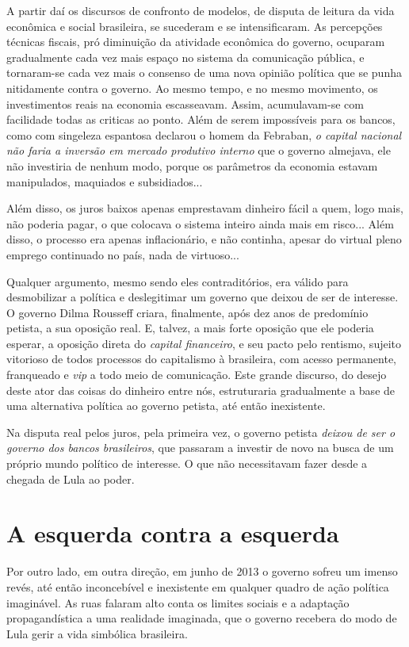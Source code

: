 A partir daí os discursos de confronto de modelos, de disputa de leitura
da vida econômica e social brasileira, se sucederam e se intensificaram.
As percepções técnicas fiscais, pró diminuição da atividade econômica do
governo, ocuparam gradualmente cada vez mais espaço no sistema da
comunicação pública, e tornaram-se cada vez mais o consenso de uma nova
opinião política que se punha nitidamente contra o governo. Ao mesmo
tempo, e no mesmo movimento, os investimentos reais na economia
escasseavam. Assim, acumulavam-se com facilidade todas as criticas ao
ponto. Além de serem impossíveis para os bancos, como com singeleza
espantosa declarou o homem da Febraban, \emph{o capital nacional não
faria a inversão em mercado produtivo interno} que o governo almejava,
ele não investiria de nenhum modo, porque os parâmetros da economia
estavam manipulados, maquiados e subsidiados...

Além disso, os juros baixos apenas emprestavam dinheiro fácil a quem,
logo mais, não poderia pagar, o que colocava o sistema inteiro ainda
mais em risco... Além disso, o processo era apenas inflacionário, e não
continha, apesar do virtual pleno emprego continuado no país, nada de
virtuoso...

Qualquer argumento, mesmo sendo eles contraditórios, era válido para
desmobilizar a política e deslegitimar um governo que deixou de ser de
interesse. O governo Dilma Rousseff criara, finalmente, após dez anos de
predomínio petista, a sua oposição real. E, talvez, a mais forte
oposição que ele poderia esperar, a oposição direta do \emph{capital
financeiro}, e seu pacto pelo rentismo, sujeito vitorioso de todos
processos do capitalismo à brasileira, com acesso permanente, franqueado
e \emph{vip} a todo meio de comunicação. Este grande discurso, do desejo
deste ator das coisas do dinheiro entre nós, estruturaria gradualmente a
base de uma alternativa política ao governo petista, até então
inexistente.

Na disputa real pelos juros, pela primeira vez, o governo petista
\emph{deixou de ser o governo dos bancos brasileiros}, que passaram a
investir de novo na busca de um próprio mundo político de interesse. O
que não necessitavam fazer desde a chegada de Lula ao poder.

  \section{A esquerda contra a
  esquerda}\label{a-esquerda-contra-a-esquerda}

Por outro lado, em outra direção, em junho de 2013 o governo sofreu um
imenso revés, até então inconcebível e inexistente em qualquer quadro de
ação política imaginável. As ruas falaram alto conta os limites sociais
e a adaptação propagandística a uma realidade imaginada, que o governo
recebera do modo de Lula gerir a vida simbólica brasileira.

